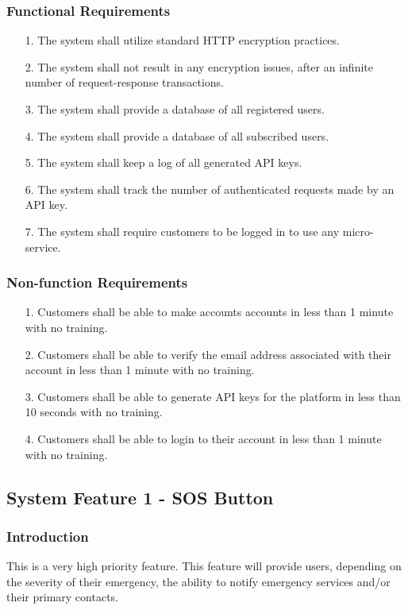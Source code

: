 \documentclass{scrreprt}
\begin{document}
\subsubsection{Functional Requirements}
\begin{enumerate}
	\item[1.] The system shall utilize standard HTTP encryption practices.
	\item[2.] The system shall not result in any encryption issues, after an infinite number of request-response transactions.
	\item[3.] The system shall provide a database of all registered users.
	\item[4.] The system shall provide a database of all subscribed users.
	\item[5.] The system shall keep a log of all generated API keys.
	\item[6.] The system shall track the number of authenticated requests made by an API key.
	\item[7.] The system shall require customers to be logged in to use any micro-service.
\end{enumerate}

\subsubsection{Non-function Requirements}
\begin{enumerate}
	\item[1.] Customers shall be able to make accounts accounts in less than 1 minute with no training.
	\item[2.] Customers shall be able to verify the email address associated with their account in less than 1 minute with no training.
	\item[3.] Customers shall be able to generate API keys for the platform in less than 10 seconds with no training.
	\item[4.] Customers shall be able to login to their account in less than 1 minute with no training.
\end{enumerate}


\subsection{System Feature 1 - SOS Button}
\subsubsection{Introduction}
This is a very high priority feature. This feature will provide users, depending on the severity of their emergency, the ability to notify emergency services and/or their primary contacts.
\end{document}

